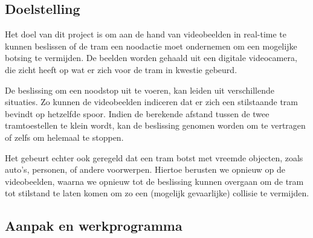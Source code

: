 \documentclass[]{book}
\begin{document}
\subsection{Doelstelling}\label{sec:Doelstelling}


Het doel van dit project is om aan de hand van videobeelden in real-time te kunnen beslissen of de tram een noodactie moet ondernemen om een mogelijke botsing te vermijden. De beelden worden gehaald uit een digitale videocamera, die zicht heeft op wat er zich voor de tram in kwestie gebeurd.

De beslissing om een noodstop uit te voeren, kan leiden uit verschillende situaties. Zo kunnen de videobeelden indiceren dat er zich een stilstaande tram bevindt op hetzelfde spoor. Indien de berekende afstand tussen de twee tramtoestellen te klein wordt, kan de beslissing genomen worden om te vertragen of zelfs om helemaal te stoppen.

Het gebeurt echter ook geregeld dat een tram botst met vreemde objecten, zoals auto's, personen, of andere voorwerpen. Hiertoe berusten we opnieuw op de videobeelden, waarna we opnieuw tot de beslissing kunnen overgaan om de tram tot stilstand te laten komen om zo een (mogelijk gevaarlijke) collisie te vermijden.


\subsection{Aanpak en werkprogramma}\label{sec:Aanpak}

\end{document}
